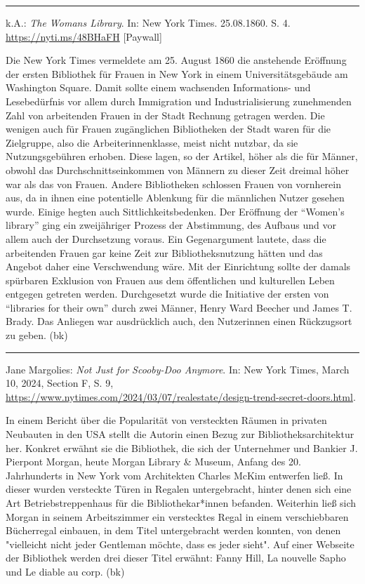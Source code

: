 \documentclass[a4paper,
fontsize=11pt,
oneside,
numbers=noperiodatend,
parskip=half-,
bibliography=totoc,
final
]{scrartcl}
\begin{document}
\begin{center}\rule{0.5\linewidth}{0.5pt}\end{center}

k.A.: \emph{The Woman\textquotesingle s Library}. In: New York Times.
25.08.1860. S. 4. \url{https://nyti.ms/48BHaFH} {[}Paywall{]}

Die New York Times vermeldete am 25. August 1860 die anstehende
Eröffnung der ersten Bibliothek für Frauen in New York in einem
Universitätsgebäude am Washington Square. Damit sollte einem wachsenden
Informations- und Lesebedürfnis vor allem durch Immigration und
Industrialisierung zunehmenden Zahl von arbeitenden Frauen in der Stadt
Rechnung getragen werden. Die wenigen auch für Frauen zugänglichen
Bibliotheken der Stadt waren für die Zielgruppe, also die
Arbeiterinnenklasse, meist nicht nutzbar, da sie Nutzungsgebühren
erhoben. Diese lagen, so der Artikel, höher als die für Männer, obwohl
das Durchschnittseinkommen von Männern zu dieser Zeit dreimal höher war
als das von Frauen. Andere Bibliotheken schlossen Frauen von vornherein
aus, da in ihnen eine potentielle Ablenkung für die männlichen Nutzer
gesehen wurde. Einige hegten auch Sittlichkeitsbedenken. Der Eröffnung
der \enquote{Women's library} ging ein zweijähriger Prozess der
Abstimmung, des Aufbaus und vor allem auch der Durchsetzung voraus. Ein
Gegenargument lautete, dass die arbeitenden Frauen gar keine Zeit zur
Bibliotheksnutzung hätten und das Angebot daher eine Verschwendung wäre.
Mit der Einrichtung sollte der damals spürbaren Exklusion von Frauen aus
dem öffentlichen und kulturellen Leben entgegen getreten werden.
Durchgesetzt wurde die Initiative der ersten von \enquote{libraries for
their own} durch zwei Männer, Henry Ward Beecher und James T. Brady. Das
Anliegen war ausdrücklich auch, den Nutzerinnen einen Rückzugsort zu
geben. (bk)

\begin{center}\rule{0.5\linewidth}{0.5pt}\end{center}

Jane Margolies: \emph{Not Just for Scooby-Doo Anymore}. In: New York
Times, March 10, 2024, Section F, S. 9, \url{https://www.nytimes.com/2024/03/07/realestate/design-trend-secret-doors.html}.

In einem Bericht über die Popularität von versteckten Räumen in privaten
Neubauten in den USA stellt die Autorin einen Bezug zur
Bibliotheksarchitektur her. Konkret erwähnt sie die Bibliothek, die sich
der Unternehmer und Bankier J. Pierpont Morgan, heute Morgan Library \&
Museum, Anfang des 20. Jahrhunderts in New York vom Architekten Charles
McKim entwerfen ließ. In dieser wurden versteckte Türen in Regalen
untergebracht, hinter denen sich eine Art Betriebstreppenhaus für die
Bibliothekar*innen befanden. Weiterhin ließ sich Morgan in seinem
Arbeitszimmer ein verstecktes Regal in einem verschiebbaren Bücherregal
einbauen, in dem Titel untergebracht werden konnten, von denen
"vielleicht nicht jeder Gentleman möchte, dass es jeder sieht". Auf
einer Webseite der Bibliothek werden drei dieser Titel erwähnt: Fanny
Hill, La nouvelle Sapho und Le diable au corp. (bk)
\end{document}
